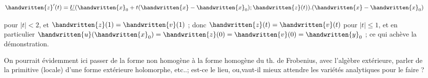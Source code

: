 \[
\handwritten{z}'(t)=\underline{U}(\handwritten{x}_0+t(\handwritten{x}-\handwritten{x}_0);\handwritten{z}(t)).(\handwritten{x}-\handwritten{x}_0)
\]

pour $|t|<2$, et $\handwritten{z}(1)=\handwritten{v}(1)$ ; donc $\handwritten{z}(t)=\handwritten{v}(t)$ pour $|t|\leq 1$, et en particulier $\handwritten{u}(\handwritten{x}_0)=\handwritten{z}(0)=\handwritten{v}(0)=\handwritten{y}_0$ ; ce qui achève la démonstration.

On pourrait évidemment ici passer de la forme non homogène à la forme homogène du th. de Frobenius, avec l'algèbre extérieure, parler de la primitive (locale) d'une forme extérieure holomorphe, etc..; est-ce le lieu, ou,vaut-il mieux attendre les variétés analytiques pour le faire ?

